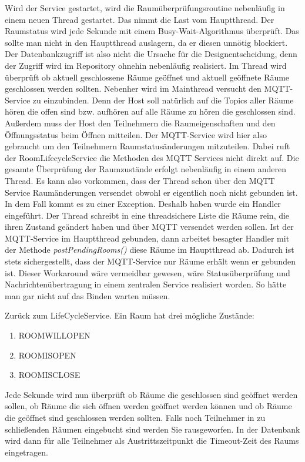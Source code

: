 Wird der Service gestartet, wird die Raumüberprüfungsroutine nebenläufig in einem neuen Thread gestartet. Das nimmt die Last vom Hauptthread.
Der Raumstatus wird jede Sekunde mit einem Busy-Wait-Algorithmus überprüft.
Das sollte man nicht in den Hauptthread auslagern, da er diesen unnötig blockiert. 
Der Datenbankzugriff ist also nicht die Ursache für die Designentscheidung, denn der Zugriff wird im Repository ohnehin nebenläufig realisiert.
Im Thread wird überprüft ob aktuell geschlossene Räume geöffnet und aktuell geöffnete Räume geschlossen werden sollten.
Nebenher wird im Mainthread versucht den MQTT-Service zu einzubinden. 
Denn der Host soll natürlich auf die Topics aller Räume hören die offen sind bzw. aufhören auf alle Räume zu hören die geschlossen sind.
Außerdem muss der Host den Teilnehmern die Raumeigenschaften und den Öffnungsstatus beim Öffnen mitteilen. 
Der MQTT-Service wird hier also gebraucht um den Teilnehmern Raumstatusänderungen mitzuteilen.
Dabei ruft der RoomLifecycleService die Methoden des MQTT Services nicht direkt auf. Die gesamte Überprüfung der Raumzustände erfolgt nebenläufig in einem anderen Thread. 
Es kann also vorkommen, dass der Thread schon über den MQTT Service Raumänderungen versendet obwohl er eigentlich noch nicht gebunden ist. 
In dem Fall kommt es zu einer Exception.
Deshalb haben wurde ein Handler eingeführt. Der Thread schreibt in eine threadsichere Liste die Räume rein, die ihren Zustand geändert haben und über MQTT versendet werden sollen. 
Ist der MQTT-Service im Hauptthread gebunden, dann arbeitet besagter Handler mit der Methode \textit{postPendingRooms()} diese Räume im Hauptthread ab. 
Dadurch ist stets sichergestellt, dass der MQTT-Service nur Räume erhält wenn er gebunden ist. 
Dieser Workaround wäre vermeidbar gewesen, wäre Statusüberprüfung und Nachrichtenübertragung in einem zentralen Service realisiert worden. So hätte man gar nicht auf das Binden warten müssen.

Zurück zum LifeCycleService.
Ein Raum hat drei mögliche Zustände:
\begin{enumerate}
\item ROOMWILLOPEN
\item ROOMISOPEN
\item ROOMISCLOSE
\end{enumerate}
 Jede Sekunde wird nun überprüft ob Räume die geschlossen sind geöffnet werden sollen, ob Räume die sich öffnen werden geöffnet werden können und ob Räume die geöffnet sind geschlossen werden sollten. 
Falls noch Teilnehmer in zu schließenden Räumen eingebucht sind werden Sie rausgeworfen. In der Datenbank wird dann für alle Teilnehmer als Austrittszeitpunkt die Timeout-Zeit des Raums eingetragen.



